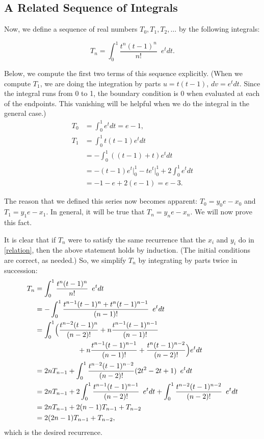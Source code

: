\subsection{A Related Sequence of Integrals}
Now, we define a sequence of real numbers $T_0, T_1, T_2, \ldots$ by the following integrals:

$$T_n=\int_{0}^{1}\frac{t^{n}(t-1)^{n}}{n!}\phantom{1} e^tdt.$$

Below, we compute the first two terms of this sequence
explicitly. (When we compute $T_1$, we are doing the integration by
parts $u=t(t-1)$, $dv=e^tdt$. Since the integral runs from 0 to 1, the
boundary condition is 0 when evaluated at each of the endpoints. This
vanishing will be helpful when we do the integral in the general
case.)
\begin{align*}
T_0&=\int_{0}^{1}e^tdt=e-1,\\
T_1&=\int_{0}^{1}t(t-1)e^tdt\\
&=-\int_{0}^{1}((t-1)+t)e^tdt\\
&=-(t-1)e^t\Bigg|_0^{1}-te^t\Bigg|_0^{1}+2\int_{0}^{1}e^tdt\\
&=-1-e+2(e-1)=e-3.
\end{align*}

The reason that we defined this series now becomes apparent:
$T_0=y_0e-x_0$ and $T_1=y_1e-x_1$. In general, it will be true
that $T_n=y_ne-x_n$. We will now prove this fact.

It is clear that if $T_n$ were to satisfy the same recurrence that
the $x_i$ and $y_i$ do in \eqref{relation}, then the above
statement holds by induction. (The initial conditions are correct, as
needed.) So, we simplify $T_n$ by integrating by parts twice in
succession:
\begin{align*}
T_n&=\int_{0}^{1}\frac{t^{n}(t-1)^{n}}{n!}\phantom{1} e^tdt\\
&=-\int_{0}^{1}\frac{t^{n-1}(t-1)^{n}+t^{n}(t-1)^{n-1}}{(n-1)!}\phantom{1} e^tdt\\
&=\int_{0}^{1}\Bigl(\frac{t^{n-2}(t-1)^{n}}{(n-2)!}+n\frac{t^{n-1}(t-1)^{n-1}}{(n-1)!}\\
  & \qquad\qquad\qquad +  n\frac{t^{n-1}(t-1)^{n-1}}{(n-1)!}+\frac{t^{n}(t-1)^{n-2}}{(n-2)!}\Bigr)e^tdt\\
&=2nT_{n-1}+\int_{0}^{1}\frac{t^{n-2}(t-1)^{n-2}}{(n-2)!}(2t^2-2t+1)\phantom{1} e^tdt\\
&=2nT_{n-1}+2\int_{0}^{1}\frac{t^{n-1}(t-1)^{n-1}}{(n-2)!}\phantom{1} e^tdt+\int_{0}^{1}\frac{t^{n-2}(t-1)^{n-2}}{(n-2)!}\phantom{1} e^tdt\\
&=2nT_{n-1}+2(n-1)T_{n-1}+T_{n-2}\\
&=2(2n-1)T_{n-1}+T_{n-2},
\end{align*}
which is the desired recurrence.

